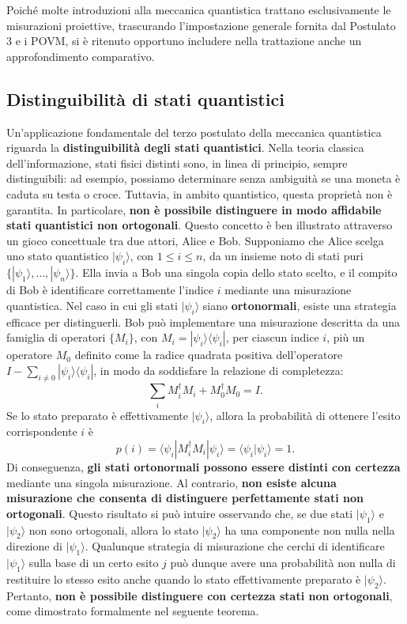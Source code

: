 \documentclass[a4paper,12pt]{report}
\theoremstyle{plain}
\begin{document}
Poiché molte introduzioni alla meccanica quantistica trattano esclusivamente le misurazioni proiettive, trascurando l'impostazione generale fornita dal Postulato 3 e i POVM, si è ritenuto opportuno includere nella trattazione anche un approfondimento comparativo.

\subsection{Distinguibilità di stati quantistici}
Un'applicazione fondamentale del terzo postulato della meccanica quantistica riguarda la \textbf{distinguibilità degli stati quantistici}. Nella teoria classica dell'informazione, stati fisici distinti sono, in linea di principio, sempre distinguibili: ad esempio, possiamo determinare senza ambiguità se una moneta è caduta su testa o croce. Tuttavia, in ambito quantistico, questa proprietà non è garantita. In particolare, \textbf{non è possibile distinguere in modo affidabile stati quantistici non ortogonali}.
Questo concetto è ben illustrato attraverso un gioco concettuale tra due attori, Alice e Bob. Supponiamo che Alice scelga uno stato quantistico $|\psi_i\rangle$, con $1 \le i \le n$, da un insieme noto di stati puri $\{|\psi_1\rangle, \ldots, |\psi_n\rangle\}$. Ella invia a Bob una singola copia dello stato scelto, e il compito di Bob è identificare correttamente l'indice $i$ mediante una misurazione quantistica.
Nel caso in cui gli stati $|\psi_i\rangle$ siano \textbf{ortonormali}, esiste una strategia efficace per distinguerli. Bob può implementare una misurazione descritta da una famiglia di operatori $\{M_i\}$, con $M_i = |\psi_i\rangle\langle\psi_i|$, per ciascun indice $i$, più un operatore $M_0$ definito come la radice quadrata positiva dell'operatore $I - \sum_{i \ne 0} |\psi_i\rangle\langle\psi_i|$, in modo da soddisfare la relazione di completezza:
$$
\sum_i M_i^\dagger M_i + M_0^\dagger M_0 = I.
$$
Se lo stato preparato è effettivamente $|\psi_i\rangle$, allora la probabilità di ottenere l'esito corrispondente $i$ è
$$
p(i) = \langle\psi_i|M_i^\dagger M_i|\psi_i\rangle = \langle\psi_i|\psi_i\rangle = 1.
$$
Di conseguenza, \textbf{gli stati ortonormali possono essere distinti con certezza} mediante una singola misurazione.
Al contrario, \textbf{non esiste alcuna misurazione che consenta di distinguere perfettamente stati non ortogonali}. Questo risultato si può intuire osservando che, se due stati $|\psi_1\rangle$ e $|\psi_2\rangle$ non sono ortogonali, allora lo stato $|\psi_2\rangle$ ha una componente non nulla nella direzione di $|\psi_1\rangle$. Qualunque strategia di misurazione che cerchi di identificare $|\psi_1\rangle$ sulla base di un certo esito $j$ può dunque avere una probabilità non nulla di restituire lo stesso esito anche quando lo stato effettivamente preparato è $|\psi_2\rangle$. Pertanto, \textbf{non è possibile distinguere con certezza stati non ortogonali}, come dimostrato formalmente nel seguente teorema.
\end{document}
